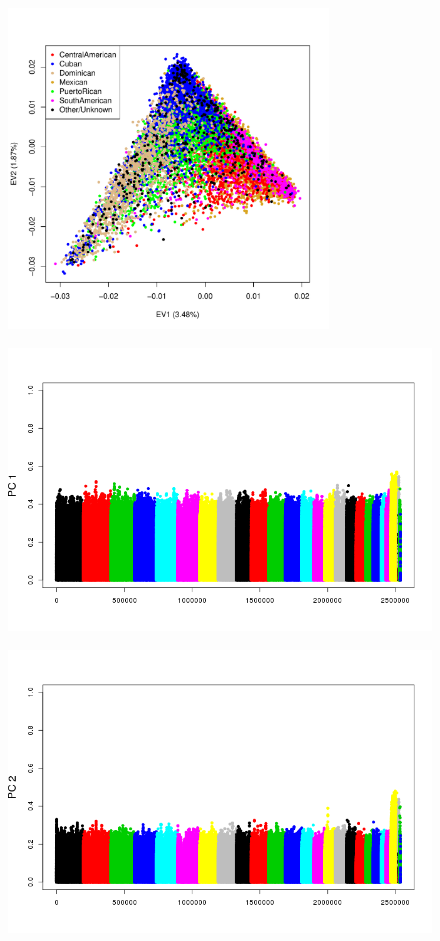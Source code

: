 \documentclass{beamer}
\begin{document}
\begin{frame}
\centering
\begin{figure}
\includegraphics[height=8.5cm]{../pca_x_ev12_col.pdf}
\end{figure}
\end{frame}

\begin{frame}
\centering
\begin{figure}
\includegraphics[height=7.5cm]{../pca_x_corrManh_ev1.png}
\end{figure}
\end{frame}

\begin{frame}
\centering
\begin{figure}
\includegraphics[height=7.5cm]{../pca_x_corrManh_ev2.png}
\end{figure}
\end{frame}
\end{document}
